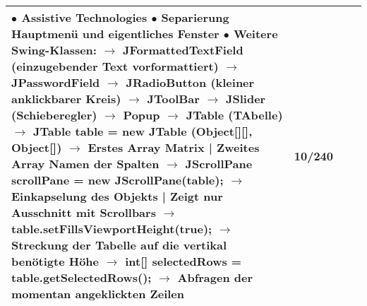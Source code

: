\documentclass[11pt,a4paper]{article}
\begin{document}
\begin{center}
\begin{longtable}[h]{ | p{2.3cm} | p{2.3cm} | p{12.6cm} | p{1.2cm} | }
{	$\bullet$ Assistive Technologies \\
	$\bullet$ Separierung Hauptmenü und eigentliches Fenster \\
	$\bullet$ Weitere Swing-Klassen: \\
	\hspace{0.4cm} $\rightarrow$ JFormattedTextField (einzugebender Text vorformattiert) \\
	\hspace{0.4cm} $\rightarrow$ JPasswordField \\
	\hspace{0.4cm} $\rightarrow$ JRadioButton (kleiner anklickbarer Kreis) \\
	\hspace{0.4cm} $\rightarrow$ JToolBar \\
	\hspace{0.4cm} $\rightarrow$ JSlider (Schieberegler) \\
	\hspace{0.4cm} $\rightarrow$ Popup \\
	\hspace{0.4cm} $\rightarrow$ JTable (TAbelle) \\
	\hspace{0.8cm} $\rightarrow$ JTable table = new JTable (Object[][], Object[]) \\ 
	\hspace{0.8cm} $\rightarrow$ Erstes Array Matrix | Zweites Array Namen der Spalten \\
	\hspace{0.8cm} $\rightarrow$ JScrollPane scrollPane = new JScrollPane(table); \\
	\hspace{0.8cm} $\rightarrow$ Einkapselung des Objekts | Zeigt nur Ausschnitt mit Scrollbars \\
	\hspace{0.8cm} $\rightarrow$ table.setFillsViewportHeight(true); \\
	\hspace{0.8cm} $\rightarrow$ Streckung der Tabelle auf die vertikal benötigte Höhe \\
	\hspace{0.8cm} $\rightarrow$ int[] selectedRows = table.getSelectedRows(); \\
	\hspace{0.8cm} $\rightarrow$ Abfragen der momentan angeklickten Zeilen  } & 10/240 \\
	\hline
	
	
	

\end{longtable}
\end{center}
\end{document}
